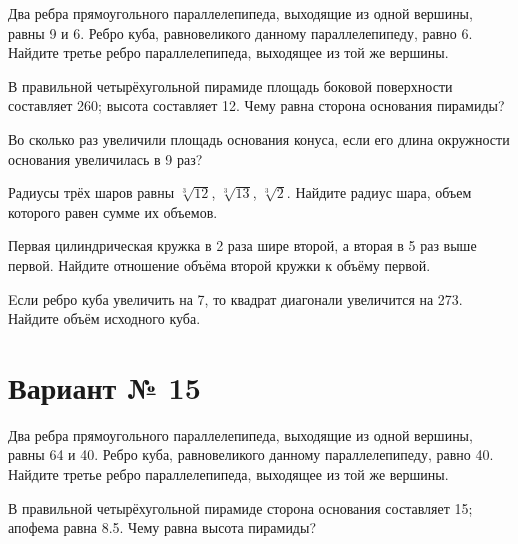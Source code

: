 \documentclass[4apaper]{article}
\begin{document}
\begin{taskBN}{1}
Два ребра прямоугольного параллелепипеда, выходящие из одной вершины, равны 9 и 6. Ребро куба, равновеликого данному параллелепипеду, равно 6. Найдите третье ребро параллелепипеда, выходящее из той же вершины.
\end{taskBN}

\begin{taskBN}{2}
В правильной четырёхугольной пирамиде площадь боковой поверхности составляет 260; высота составляет 12. Чему равна сторона основания пирамиды?
\end{taskBN}

\begin{taskBN}{3}
Во сколько раз увеличили площадь основания конуса, если его длина окружности основания увеличилась в 9 раз?
\end{taskBN}

\begin{taskBN}{4}
Радиусы трёх шаров равны $\sqrt[3]{12}$, $\sqrt[3]{13}$, $\sqrt[3]{2}$. Найдите радиус шара, объем которого равен сумме их объемов.
\end{taskBN}

\begin{taskBN}{5}
 Первая цилиндрическая кружка в 2 раза шире второй, а вторая в 5 раз выше первой. Найдите отношение объёма второй кружки к объёму первой.
\end{taskBN}

\begin{taskBN}{6}
Eсли ребро куба увеличить на 7, то квадрат диагонали увеличится на 273. Найдите объём исходного куба.
\end{taskBN}
\newpage\section*{Вариант № 15}

\begin{taskBN}{1}
Два ребра прямоугольного параллелепипеда, выходящие из одной вершины, равны 64 и 40. Ребро куба, равновеликого данному параллелепипеду, равно 40. Найдите третье ребро параллелепипеда, выходящее из той же вершины.
\end{taskBN}

\begin{taskBN}{2}
В правильной четырёхугольной пирамиде сторона основания составляет 15; апофема равна 8.5. Чему равна высота пирамиды?
\end{taskBN}
\end{document}
